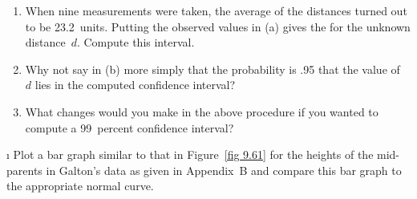 \begin{LJSItem}
\begin{enumerate}
\item  When nine measurements were taken, the average of the distances turned
out to be 23.2~units.  Putting the observed values in (a)
gives the  for the unknown distance~$d$. 
Compute this interval.

\item  Why not say in (b) more simply that the
probability is .95 that the value of~$d$ lies in the computed confidence
interval?

\item  What changes would you make in the above procedure if you wanted to
compute a 99~percent confidence interval?
\end{enumerate}

\i\label{exer 9.4.14}  Plot a bar graph similar to that in Figure~\ref{fig 9.61} 
for the heights of the mid-parents in Galton's data as given in Appendix~B 
and compare this bar graph to the appropriate normal curve.

\end{LJSItem}
%
